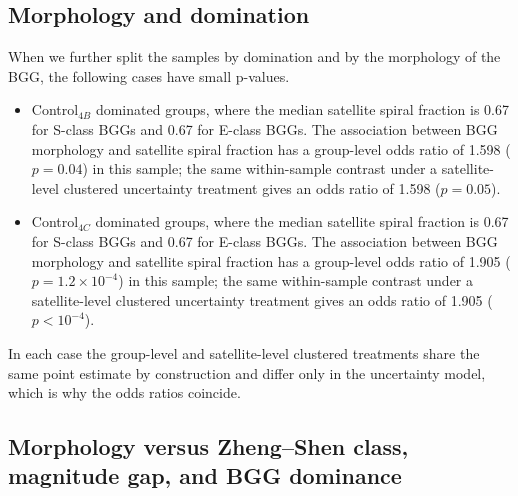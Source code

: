 \documentclass{aa}
\begin{document}
\begin{appendix}
\subsection{Morphology and domination}\label{app:morph_domination}

When we further split the samples by domination and by the morphology of the BGG, the following cases have small p-values.
\begin{itemize}

\item Control$_{4B}$ dominated groups, where the median satellite spiral fraction is
0.67 for S-class BGGs and 0.67 for E-class BGGs.
The association between BGG morphology and satellite spiral fraction has a group-level odds ratio of 1.598 (\(p = 0.04\)) in this sample; the same within-sample contrast under a satellite-level clustered uncertainty treatment gives
an odds ratio of 1.598 (\(p = 0.05\)).

\item Control$_{4C}$ dominated groups, where the median satellite spiral fraction is
0.67 for S-class BGGs and 0.67 for E-class BGGs.
The association between BGG morphology and satellite spiral fraction has a group-level odds ratio of 1.905 (\(p = 1.2\times 10^{-4}\)) in this sample; the same within-sample contrast under a satellite-level clustered uncertainty treatment gives
an odds ratio of 1.905 (\(p<10^{-4}\)).

\end{itemize}
In each case the group-level and satellite-level clustered treatments share the same point estimate by construction and differ only in the uncertainty model, which is why the odds ratios coincide.




\subsection{Morphology versus Zheng--Shen class, magnitude gap, and BGG dominance}\label{app:zheng_shen}


\end{appendix}
\end{document}
